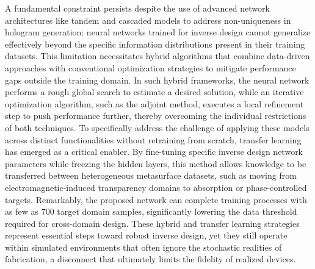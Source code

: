 A fundamental constraint persists despite the use of advanced network architectures like tandem and cascaded models to address non-uniqueness in hologram generation: neural networks trained for inverse design cannot generalize effectively beyond the specific information distributions present in their training datasets. This limitation necessitates hybrid algorithms that combine data-driven approaches with conventional optimization strategies to mitigate performance gaps outside the training domain. In such hybrid frameworks, the neural network performs a rough global search to estimate a desired solution, while an iterative optimization algorithm, such as the adjoint method, executes a local refinement step to push performance further, thereby overcoming the individual restrictions of both techniques. To specifically address the challenge of applying these models across distinct functionalities without retraining from scratch, transfer learning has emerged as a critical enabler. By fine-tuning specific inverse design network parameters while freezing the hidden layers, this method allows knowledge to be transferred between heterogeneous metasurface datasets, such as moving from electromagnetic-induced transparency domains to absorption or phase-controlled targets. \citep{doi_10_1364_ol_514212_108a4a7f} \citep{doi_10_1109_ieeeconf35879_2020_9330480_27bef614} Remarkably, the proposed network can complete training processes with as few as 700 target domain samples, significantly lowering the data threshold required for cross-domain design. These hybrid and transfer learning strategies represent essential steps toward robust inverse design, yet they still operate within simulated environments that often ignore the stochastic realities of fabrication, a disconnect that ultimately limits the fidelity of realized devices. \citep{doi_10_1021_acsphotonics_2c00968_06a2e96b} \citep{doi_10_1364_ol_514212_108a4a7f}

